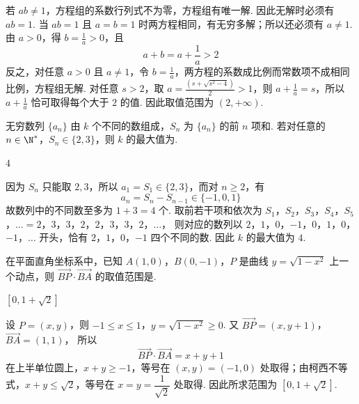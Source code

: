 \begin{solution}
若 \(ab\ne1\)，方程组的系数行列式不为零，方程组有唯一解. 因此无解时必须有 \(ab=1\). 当 \(ab=1\) 且 \(a=b=1\) 时两方程相同，有无穷多解；所以还必须有 \(a\ne1\). 由 \(a>0\)，得 \(b=\frac{1}{a}>0\)，且
\[
a+b=a+\frac1a>2
\]
反之，对任意 \(a>0\) 且 \(a\ne1\)，令 \(b=\frac{1}{a}\)，两方程的系数成比例而常数项不成相同比例，方程组无解. 对任意 \(s>2\)，取 \(a=\frac{(s+\sqrt{s^2-4})}{2}>1\)，则 \(a+\frac{1}{a}=s\)，所以 \(a+\frac{1}{a}\) 恰可取得每个大于 \(2\) 的值. 因此取值范围为 \((2,+\infty)\).
\end{solution}

\begin{problem}
无穷数列 \(\{a_n\}\) 由 \(k\) 个不同的数组成，\(S_n\) 为 \(\{a_n\}\) 的前 \(n\) 项和. 若对任意的 \(n\in\N^*\)，\(S_n\in\{2,3\}\)，则 \(k\) 的最大值为\fillinblank{}.
\end{problem}

\begin{answer}
\(4\)
\end{answer}

\begin{solution}
因为 \(S_n\) 只能取 \(2,3\)，所以 \(a_1=S_1\in\{2,3\}\)，而对 \(n\ge2\)，有
\[
a_n=S_n-S_{n-1}\in\{-1,0,1\}
\]
故数列中的不同数至多为 \(1+3=4\) 个. 取前若干项和依次为
\(S_1\)，\(S_2\)，\(S_3\)，\(S_4\)，\(S_5\)，\(\ldots=2\)，\(3\)，\(3\)，\(2\)，\(2\)，\(3\)，\(3\)，\(2\)，\(\ldots\)，
则对应的数列以 \(2\)，\(1\)，\(0\)，\(-1\)，\(0\)，\(1\)，\(0\)，\(-1\)，\(\ldots\) 开头，恰有 \(2\)，\(1\)，\(0\)，\(-1\) 四个不同的数. 因此 \(k\) 的最大值为 \(4\).
\end{solution}

\begin{problem}
在平面直角坐标系中，已知 \(A(1,0)\)，\(B(0,-1)\)，\(P\) 是曲线 \(y=\sqrt{1-x^2}\) 上一个动点，则 \(\overrightarrow{BP}\cdot\overrightarrow{BA}\) 的取值范围是\fillinblank{}.
\end{problem}

\begin{answer}
\([0,1+\sqrt2]\)
\end{answer}

\begin{solution}
设 \(P=(x,y)\)，则 \(-1\le x\le1\)，\(y=\sqrt{1-x^2}\ge0\). 又
\(\overrightarrow{BP}=(x,y+1)\)，\(\overrightarrow{BA}=(1,1)\)，
所以
\[
\overrightarrow{BP}\cdot\overrightarrow{BA}=x+y+1
\]
在上半单位圆上，\(x+y\ge-1\)，等号在 \((x,y)=(-1,0)\) 处取得；由柯西不等式，\(x+y\le\sqrt2\)，等号在 \(x=y=\dfrac1{\sqrt2}\) 处取得. 因此所求范围为 \([0,1+\sqrt2]\).
\end{solution}


